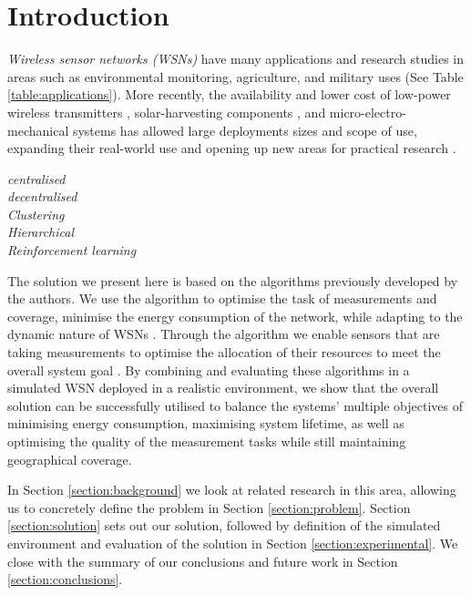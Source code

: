 \section{Introduction}

\textit{Wireless sensor networks (WSNs)} have many applications and research studies in areas such as environmental monitoring, agriculture, and military uses (See Table \ref{table:applications}). More recently, the availability and lower cost of low-power wireless transmitters \citep{902661}, solar-harvesting components \citep{Prauzek2018}, and micro-electro-mechanical systems \citep{1045391} has allowed large deployments sizes and scope of use, expanding their real-world use and opening up new areas for practical research \citep{Kandris2020}.



\textit{centralised}\\
\textit{decentralised}\\
\textit{Clustering} \\
\textit{Hierarchical} \\
\textit{Reinforcement learning}\\
\citep{10.1007/978-3-642-11814-2_4, 10.1504/IJCNDS.2012.048871}


The solution we present here is based on the algorithms previously developed by the authors. We use the \acronymATARIA{}{} algorithm to optimise the task of measurements and coverage, minimise the energy consumption of the network, while adapting to the dynamic nature of WSNs \citep{creech2021dynamic}. Through the \acronymMGRAO{}{} algorithm we enable sensors that are taking measurements to optimise the allocation of their resources to meet the overall system goal \citep{creech2021resource}. By combining and evaluating these algorithms in a simulated WSN deployed in a realistic environment, we show that the overall solution can be successfully utilised to balance the systems' multiple objectives of minimising energy consumption, maximising system lifetime, as well as optimising the quality of the measurement tasks while still maintaining geographical coverage.

In Section \ref{section:background} we look at related research in this area, allowing us to concretely define the problem in Section \ref{section:problem}. Section \ref{section:solution} sets out our solution, followed by definition of the simulated environment and evaluation of the solution in Section \ref{section:experimental}. We close with the summary of our conclusions and future work in Section \ref{section:conclusions}.


